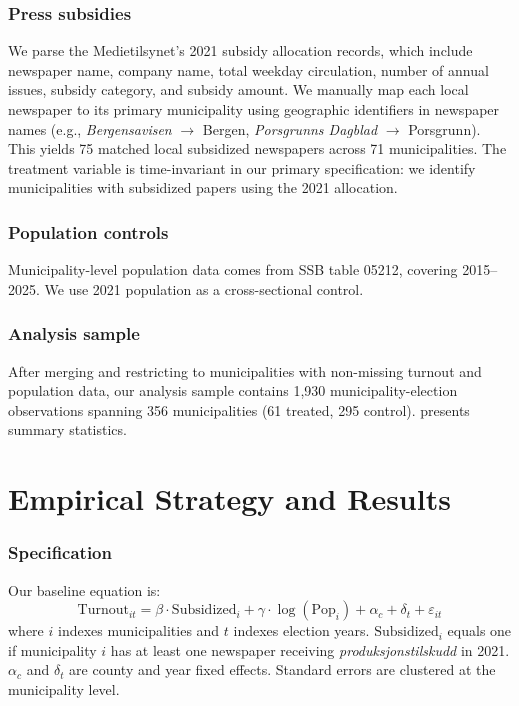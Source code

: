 \documentclass[12pt]{article}
\begin{document}
\subsubsection*{Press subsidies} We parse the Medietilsynet's 2021 subsidy allocation records, which include newspaper name, company name, total weekday circulation, number of annual issues, subsidy category, and subsidy amount. We manually map each local newspaper to its primary municipality using geographic identifiers in newspaper names (e.g., \textit{Bergensavisen} $\to$ Bergen, \textit{Porsgrunns Dagblad} $\to$ Porsgrunn). This yields 75 matched local subsidized newspapers across 71 municipalities. The treatment variable is time-invariant in our primary specification: we identify municipalities with subsidized papers using the 2021 allocation.

\subsubsection*{Population controls} Municipality-level population data comes from SSB table 05212, covering 2015--2025. We use 2021 population as a cross-sectional control.

\subsubsection*{Analysis sample} After merging and restricting to municipalities with non-missing turnout and population data, our analysis sample contains 1,930 municipality-election observations spanning 356 municipalities (61 treated, 295 control).  presents summary statistics.



\section{Empirical Strategy and Results} \label{sec:empirical}

\subsubsection*{Specification} Our baseline equation is:
\begin{equation}
\text{Turnout}_{it} = \beta \cdot \text{Subsidized}_i + \gamma \cdot \log(\text{Pop}_i) + \alpha_c + \delta_t + \varepsilon_{it}
\label{eq:main}
\end{equation}
where $i$ indexes municipalities and $t$ indexes election years. $\text{Subsidized}_i$ equals one if municipality $i$ has at least one newspaper receiving \textit{produksjonstilskudd} in 2021. $\alpha_c$ and $\delta_t$ are county and year fixed effects. Standard errors are clustered at the municipality level.
\end{document}
